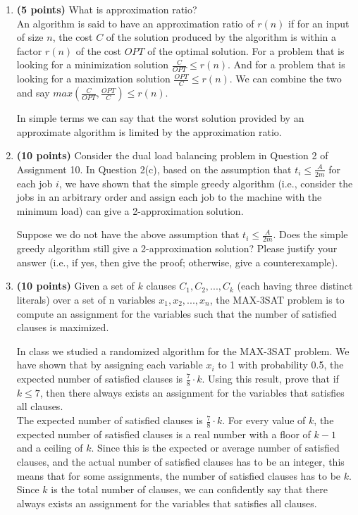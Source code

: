 \documentclass[paper=a4, fontsize=11pt]{scrartcl} %
\numberwithin{figure}{section} %
\numberwithin{table}{section} %
\begin{document}
\begin{enumerate}
\item \textbf{(5 points)} What is approximation ratio?\\

An algorithm is said to have an approximation ratio of $r(n)$ if for an input of size $n$, the cost $C$ of the solution produced by the algorithm is within a factor $r(n)$ of the cost $OPT$ of the optimal solution. For a problem that is looking for a minimization solution $\frac{C}{OPT} \leq r(n)$. And for a problem that is looking for a maximization solution $\frac{OPT}{C} \leq r(n)$. We can combine the two and say $max \left (\frac{C}{OPT}, \frac{OPT}{C} \right ) \leq r(n)$.

In simple terms we can say that the worst solution provided by an approximate algorithm is limited by the approximation ratio.

\item \textbf{(10 points)} Consider the dual load balancing problem in Question 2 of Assignment 10. In Question 2(c), based on the assumption that $t_i \leq \frac{A}{2m}$ for each job $i$, we have shown that the simple greedy algorithm (i.e., consider the jobs in an arbitrary order and assign each job to the machine with the minimum load) can give a 2-approximation solution.

Suppose we do not have the above assumption that $t_i \leq \frac{A}{2m}$. Does the simple greedy algorithm still give a 2-approximation solution? Please justify your answer (i.e., if yes, then give the proof; otherwise, give a counterexample).\\

\item \textbf{(10 points)} Given a set of $k$ clauses $C_1, C_2, . . . , C_k$ (each having three distinct literals) over a set of n variables $x_1, x_2, . . . , x_n$, the MAX-3SAT problem is to compute an assignment for the variables such that the number of satisfied clauses is maximized.

In class we studied a randomized algorithm for the MAX-3SAT problem. We have shown
that by assigning each variable $x_i$ to 1 with probability 0.5, the expected number of satisfied clauses is $\frac{7}{8} \cdot k$. Using this result, prove that if $k \leq 7$, then there always exists an assignment for the variables that satisfies all clauses.\\

The expected number of satisfied clauses is $\frac{7}{8} \cdot k$. For every value of $k$,  the expected number of satisfied clauses is a real number with a floor of $k-1$ and a ceiling of $k$. Since this is the expected or average number of satisfied clauses, and the actual number of satisfied clauses has to be an integer, this means that for some assignments, the number of satisfied clauses has to be $k$. Since $k$ is the total number of clauses, we can confidently say that there always exists an assignment for the variables that satisfies all clauses.
\end{enumerate}

\end{document}
